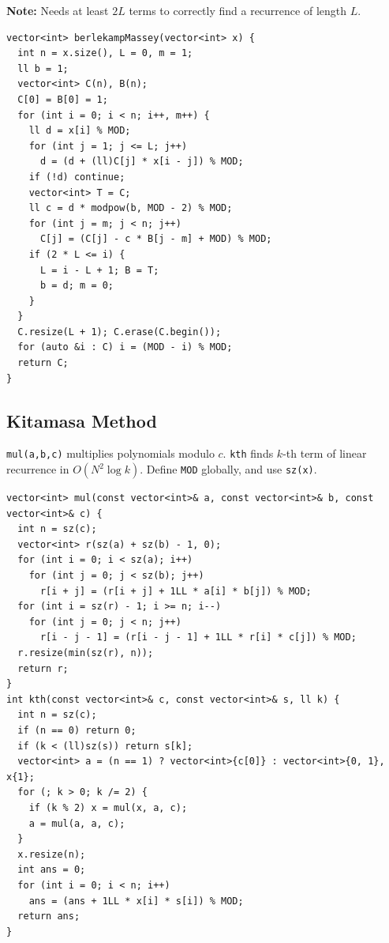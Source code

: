 \textbf{Note:} Needs at least $2L$ terms to correctly find a recurrence of length $L$.
\begin{verbatim}
vector<int> berlekampMassey(vector<int> x) {
  int n = x.size(), L = 0, m = 1;
  ll b = 1;
  vector<int> C(n), B(n);
  C[0] = B[0] = 1;
  for (int i = 0; i < n; i++, m++) {
    ll d = x[i] % MOD;
    for (int j = 1; j <= L; j++)
      d = (d + (ll)C[j] * x[i - j]) % MOD;
    if (!d) continue;
    vector<int> T = C;
    ll c = d * modpow(b, MOD - 2) % MOD;
    for (int j = m; j < n; j++)
      C[j] = (C[j] - c * B[j - m] + MOD) % MOD;
    if (2 * L <= i) {
      L = i - L + 1; B = T;
      b = d; m = 0;
    }
  }
  C.resize(L + 1); C.erase(C.begin());
  for (auto &i : C) i = (MOD - i) % MOD;
  return C;
}
\end{verbatim}

\subsection{Kitamasa Method}
\texttt{mul(a,b,c)} multiplies polynomials modulo $c$. \texttt{kth} finds $k$-th term of linear recurrence in $O(N^2 \log k)$. Define \texttt{MOD} globally, and use \texttt{sz(x)}.
\begin{verbatim}
vector<int> mul(const vector<int>& a, const vector<int>& b, const vector<int>& c) {
  int n = sz(c);
  vector<int> r(sz(a) + sz(b) - 1, 0);
  for (int i = 0; i < sz(a); i++)
    for (int j = 0; j < sz(b); j++)
      r[i + j] = (r[i + j] + 1LL * a[i] * b[j]) % MOD;
  for (int i = sz(r) - 1; i >= n; i--)
    for (int j = 0; j < n; j++)
      r[i - j - 1] = (r[i - j - 1] + 1LL * r[i] * c[j]) % MOD;
  r.resize(min(sz(r), n));
  return r;
}
int kth(const vector<int>& c, const vector<int>& s, ll k) {
  int n = sz(c);
  if (n == 0) return 0;
  if (k < (ll)sz(s)) return s[k];
  vector<int> a = (n == 1) ? vector<int>{c[0]} : vector<int>{0, 1}, x{1};
  for (; k > 0; k /= 2) {
    if (k % 2) x = mul(x, a, c);
    a = mul(a, a, c);
  }
  x.resize(n);
  int ans = 0;
  for (int i = 0; i < n; i++)
    ans = (ans + 1LL * x[i] * s[i]) % MOD;
  return ans;
}
\end{verbatim}
